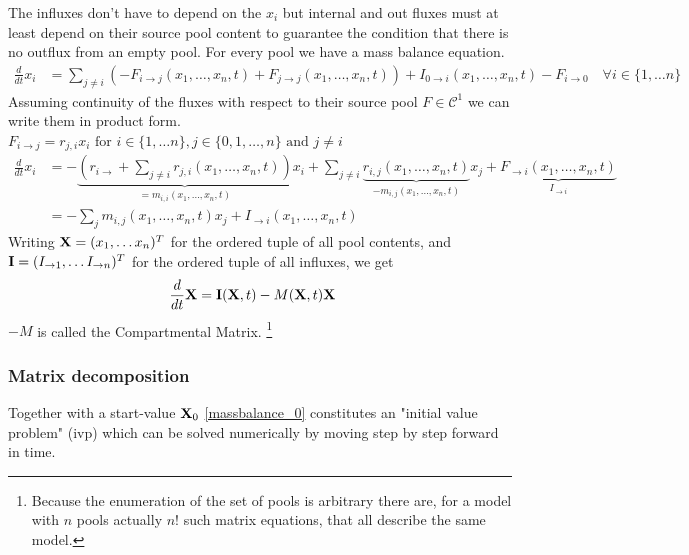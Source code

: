 The influxes don't have to depend on the $x_i$  but internal and out fluxes must at least depend on their source pool content to guarantee the 
condition that there is no outflux from an empty pool. 
\newcommand{\xnt}{(x_1, \dots, x_n, t)}
For every pool we have a mass balance equation.
\begin{align}
  \frac{d}{d t} x_i 
    &= 
    \sum_{j\ne i} (-F_{i\rightarrow j}\xnt
    +F_{j\rightarrow j}\xnt ) 
    + I_{0 \rightarrow i}\xnt 
    - F_{i \rightarrow 0} \quad \forall i \in \{1,\dots n\}
\end{align}
Assuming continuity of the fluxes with respect to their source pool 
$F \in \mathcal C^1$ we can write them in product form. 
$F_{i \rightarrow j} = r_{j,i} x_i \text{ for } i \in \{1, \dots n\} , j \in \{ 0, 1,\dots ,n\} \text{ and } j \ne i $ 
\begin{align}
  \frac{d}{d t} x_i 
    &= - \underbrace{
      \left(
      r_{i \rightarrow } 
      + 
      \sum_{j \ne i} r_{j,i}\xnt
      \right)
      }_{=m_{i,i}\xnt}
      x_i
      +
      \sum_{j \ne i} \underbrace{r_{i,j}\xnt}_{- m_{i,j} \xnt } x_j
      +
      \underbrace{F_{\rightarrow i}\xnt}_{I_{\rightarrow i}}
    \\
    &= 
      -\sum_{j} m_{i,j}\xnt x_j + I_{\rightarrow i}\xnt
\end{align}
Writing 
$\mathbf{X}=(x_1,\dots x_n)^T$ for the ordered tuple of all pool contents, and $\mathbf{I}=(I_{\rightarrow 1},\dots I_{\rightarrow n})^T$ for the ordered tuple of all influxes, we get
\begin{align}
  \frac{d}{d t} \mathbf{X} &= \mathbf{I}(\mathbf{X},t) - M(\mathbf{X},t) \mathbf{X} \label{massbalance_0}
\end{align}
$-M$ is called the Compartmental Matrix. \footnote{Because the enumeration of the set of pools is arbitrary there are, for a model with $n$ pools actually $n!$ such matrix equations, that all describe the same model.}  

\subsubsection{Matrix decomposition} 
Together with a start-value $\mathbf{X}_0$ \eqref{massbalance_0}  constitutes an "initial value problem" (ivp) which can be solved numerically by moving step by step forward in time.

%

